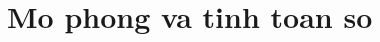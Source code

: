 \documentclass[a4paper]{Khoa_class}
\begin{document}
\chapter{Mo phong va tinh toan so}

\lipsum[1]

\localtableofcontents




\end{document}
